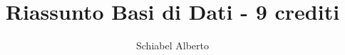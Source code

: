 \author{Schiabel Alberto}
\title{Riassunto Basi di Dati - 9 crediti}
\maketitle

\tableofcontents
\vfill